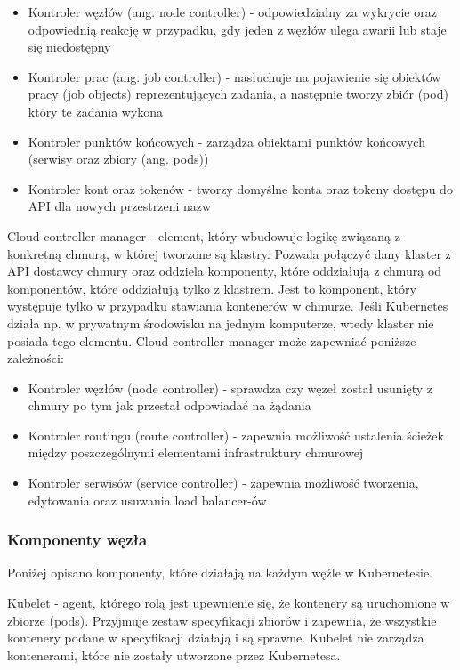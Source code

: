 \documentclass[11pt, a4]{article} %
\begin{document}
\begin{itemize} %
    \item Kontroler węzłów (ang. node controller) - odpowiedzialny za wykrycie oraz 
    odpowiednią reakcję w przypadku, gdy jeden z węzłów ulega awarii lub staje się 
    niedostępny
    \item Kontroler prac (ang. job controller) - nasłuchuje na pojawienie się obiektów 
    pracy (job objects) reprezentujących zadania, a następnie tworzy zbiór (pod) który 
    te zadania wykona
    \item Kontroler punktów końcowych - zarządza obiektami punktów końcowych (serwisy 
    oraz zbiory (ang. pods))
    \item Kontroler kont oraz tokenów - tworzy domyślne konta oraz tokeny dostępu do 
    API dla nowych przestrzeni nazw
\end{itemize}

Cloud-controller-manager - element, który wbudowuje logikę związaną z konkretną 
chmurą, w której tworzone są klastry. Pozwala połączyć dany klaster z API dostawcy 
chmury oraz oddziela komponenty, które oddziałują z chmurą od komponentów, które 
oddziałują tylko z klastrem. Jest to komponent, który występuje tylko w przypadku 
stawiania kontenerów w chmurze. Jeśli Kubernetes działa np. w prywatnym środowisku 
na jednym komputerze, wtedy klaster nie posiada tego elementu. 
Cloud-controller-manager może zapewniać poniższe zależności:

\begin{itemize} %
    \item Kontroler węzłów (node controller) - sprawdza czy węzeł został usunięty 
    z chmury po tym jak przestał odpowiadać na żądania
    \item Kontroler routingu (route controller) - zapewnia możliwość ustalenia ścieżek 
    między poszczególnymi elementami infrastruktury chmurowej
    \item Kontroler serwisów (service controller) - zapewnia możliwość 
    tworzenia, edytowania oraz usuwania load balancer-ów
\end{itemize}


\subsubsection{Komponenty węzła}

Poniżej opisano komponenty, które działają na każdym węźle w Kubernetesie.

Kubelet - agent, którego rolą jest upewnienie się, że kontenery są uruchomione 
w zbiorze (pods). Przyjmuje zestaw specyfikacji zbiorów i zapewnia, że wszystkie 
kontenery podane w specyfikacji działają i są sprawne. Kubelet nie zarządza 
kontenerami, które nie zostały utworzone przez Kubernetesa.
\end{document}
